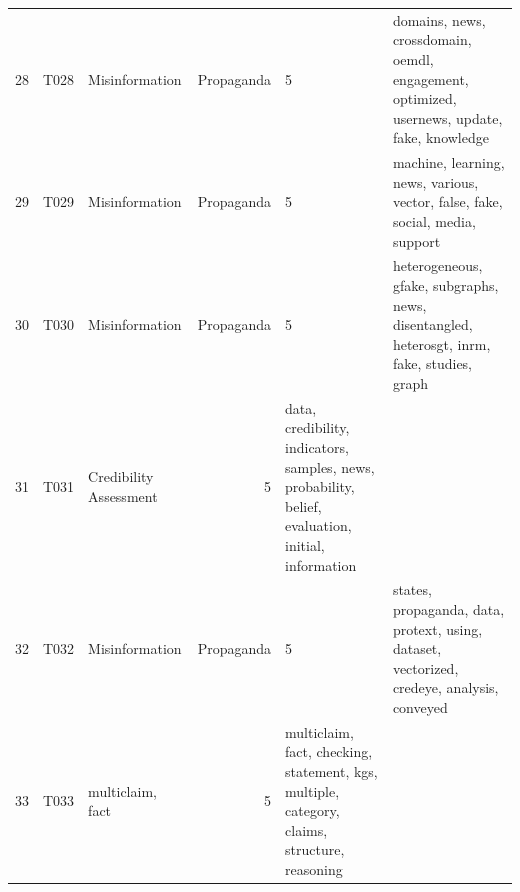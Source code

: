 \begin{tabular}{rllrl}
28 & T028 & Misinformation & Propaganda & 5 & domains, news, crossdomain, oemdl, engagement, optimized, usernews, update, fake, knowledge \\
29 & T029 & Misinformation & Propaganda & 5 & machine, learning, news, various, vector, false, fake, social, media, support \\
30 & T030 & Misinformation & Propaganda & 5 & heterogeneous, gfake, subgraphs, news, disentangled, heterosgt, inrm, fake, studies, graph \\
31 & T031 & Credibility Assessment & 5 & data, credibility, indicators, samples, news, probability, belief, evaluation, initial, information \\
32 & T032 & Misinformation & Propaganda & 5 & states, propaganda, data, protext, using, dataset, vectorized, credeye, analysis, conveyed \\
33 & T033 & multiclaim, fact & 5 & multiclaim, fact, checking, statement, kgs, multiple, category, claims, structure, reasoning \\
\bottomrule
\end{tabular}
